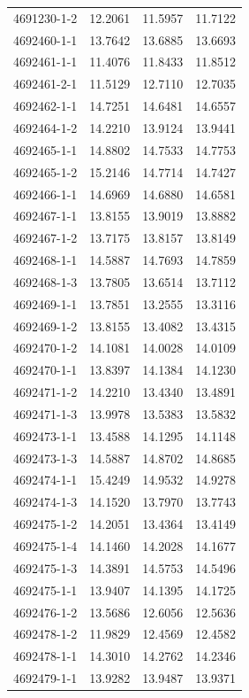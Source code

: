 \begin{longtable}{lrrr}
4691230-1-2 & 12.2061 & 11.5957 & 11.7122 \\
4692460-1-1 & 13.7642 & 13.6885 & 13.6693 \\
4692461-1-1 & 11.4076 & 11.8433 & 11.8512 \\
4692461-2-1 & 11.5129 & 12.7110 & 12.7035 \\
4692462-1-1 & 14.7251 & 14.6481 & 14.6557 \\
4692464-1-2 & 14.2210 & 13.9124 & 13.9441 \\
4692465-1-1 & 14.8802 & 14.7533 & 14.7753 \\
4692465-1-2 & 15.2146 & 14.7714 & 14.7427 \\
4692466-1-1 & 14.6969 & 14.6880 & 14.6581 \\
4692467-1-1 & 13.8155 & 13.9019 & 13.8882 \\
4692467-1-2 & 13.7175 & 13.8157 & 13.8149 \\
4692468-1-1 & 14.5887 & 14.7693 & 14.7859 \\
4692468-1-3 & 13.7805 & 13.6514 & 13.7112 \\
4692469-1-1 & 13.7851 & 13.2555 & 13.3116 \\
4692469-1-2 & 13.8155 & 13.4082 & 13.4315 \\
4692470-1-2 & 14.1081 & 14.0028 & 14.0109 \\
4692470-1-1 & 13.8397 & 14.1384 & 14.1230 \\
4692471-1-2 & 14.2210 & 13.4340 & 13.4891 \\
4692471-1-3 & 13.9978 & 13.5383 & 13.5832 \\
4692473-1-1 & 13.4588 & 14.1295 & 14.1148 \\
4692473-1-3 & 14.5887 & 14.8702 & 14.8685 \\
4692474-1-1 & 15.4249 & 14.9532 & 14.9278 \\
4692474-1-3 & 14.1520 & 13.7970 & 13.7743 \\
4692475-1-2 & 14.2051 & 13.4364 & 13.4149 \\
4692475-1-4 & 14.1460 & 14.2028 & 14.1677 \\
4692475-1-3 & 14.3891 & 14.5753 & 14.5496 \\
4692475-1-1 & 13.9407 & 14.1395 & 14.1725 \\
4692476-1-2 & 13.5686 & 12.6056 & 12.5636 \\
4692478-1-2 & 11.9829 & 12.4569 & 12.4582 \\
4692478-1-1 & 14.3010 & 14.2762 & 14.2346 \\
4692479-1-1 & 13.9282 & 13.9487 & 13.9371 \\

\end{longtable}
